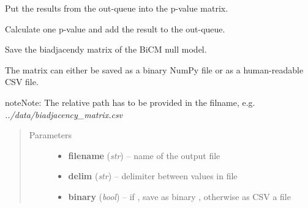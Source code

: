 \documentclass[letterpaper,10pt,english]{sphinxmanual}
\begin{document}
\begin{fulllineitems}
\begin{fulllineitems}
\label{source/src:src.bicm.BiCM.outqueue2pval_mat}
Put the results from the out-queue into the p-value matrix.

\end{fulllineitems}


\begin{fulllineitems}
\label{source/src:src.bicm.BiCM.pval_process_worker}
Calculate one p-value and add the result to the out-queue.

\end{fulllineitems}


\begin{fulllineitems}
\label{source/src:src.bicm.BiCM.save_biadjacency}
Save the biadjacendy matrix of the BiCM null model.

The matrix can either be saved as a binary NumPy  file or as a
human-readable CSV file.

\begin{notice}{note}{Note:}
The relative path has to be provided in the filname, e.g.
\emph{../data/biadjacency\_matrix.csv}
\end{notice}
\begin{quote}\begin{description}
\item[{Parameters}] \leavevmode\begin{itemize}
\item {} 
\textbf{filename} (\emph{str}) -- name of the output file

\item {} 
\textbf{delim} (\emph{str}) -- delimiter between values in file

\item {} 
\textbf{binary} (\emph{bool}) -- if , save as binary ,
otherwise as CSV a file

\end{itemize}

\end{description}\end{quote}


\end{fulllineitems}
\end{fulllineitems}
\end{document}
